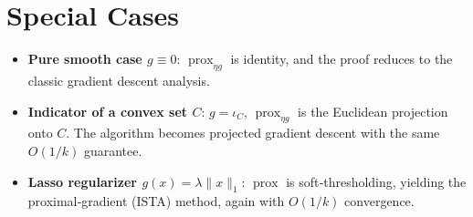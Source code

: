 \documentclass{article}
\newcommand{\prox}{\operatorname{prox}}
\begin{document}
\section*{Special Cases}
\begin{itemize}
  \item \textbf{Pure smooth case $g\equiv0$}: $\prox_{\eta g}$ is identity, and the proof reduces to the classic gradient descent analysis.
  \item \textbf{Indicator of a convex set $C$}: $g=\iota_{C}$, $\prox_{\eta g}$ is the Euclidean projection onto $C$. The algorithm becomes projected gradient descent with the same $O(1/k)$ guarantee.
  \item \textbf{Lasso regularizer $g(x)=\lambda\|x\|_{1}$}: $\prox$ is soft‑thresholding, yielding the proximal‑gradient (ISTA) method, again with $O(1/k)$ convergence.
\end{itemize}
\end{document}
